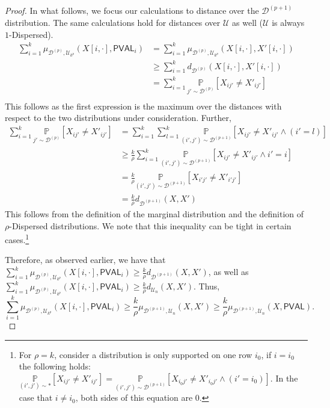 \documentclass[11pt]{article}
\newcommand{\PVAL}{\mathsf{PVAL}}
\newcommand{\sU}{\mathcal{U}}
\newcommand{\sD}{\mathcal{D}}
\begin{document}
\begin{proof}
In what follows, we focus our calculations to distance over the $\sD^{(p+1)}$ distribution. The same calculations hold for distances over $\sU$ as well ($\sU$ is always $1$-Dispersed).
\begin{equation*}
    \begin{split}
        \sum_{i=1}^{k}\mu_{\mathcal{D}^{(p)},\mathcal{U}_{k^{p}}}(X[i,\cdot], \PVAL_{i})&=\sum_{i=1}^{k}\mu_{\mathcal{D}^{(p)}, \mathcal{U}_{k^{p}}}(X[i,\cdot], X'[i,\cdot]) \\
        &\geq \sum_{i=1}^{k}d_{\sD^{(p)}}(X[i,\cdot], X'[i,\cdot])\\
        &= \sum_{i=1}^{k} \underset{j'\sim \sD^{(p)}}{\mathbb{P}}\left[X_{ij'}\neq X'_{ij'}\right]\\
    \end{split}    
\end{equation*}
This follows as the first expression is the maximum over the distances with respect to the two distributions under consideration. Further,
\begin{equation*}
    \begin{split}
        \sum_{i=1}^{k} \underset{j'\sim \sD^{(p)}}{\mathbb{P}}\left[X_{ij'}\neq X'_{ij'}\right]&= \sum_{i=1}^{k}\sum_{l=1}^{k}\underset{(i',j')\sim \mathcal{D}^{(p+1)}}{\mathbb{P}}\left [X_{ij'}\neq X'_{ij'}\wedge (i'=l)\right]\\
        &\geq \frac{k}{\rho}\sum_{i=1}^{k} \underset{(i',j')\sim \sD^{(p+1)}}{\mathbb{P}}\left[X_{ij'}\neq X'_{ij'}\wedge i'=i\right]\\
        &=\frac{k}{\rho}\underset{(i',j')\sim \sD^{(p+1)}}{\mathbb{P}}\left[X_{i'j'}\neq X'_{i'j'}\right]\\
        &=\frac{k}{\rho}d_{\sD^{(p+1)}}(X,X')
    \end{split}
\end{equation*}
This follows from the definition of the marginal distribution and the definition of $\rho$-Dispersed distributions. We note that this inequality can be tight in certain cases.\footnote{For $\rho=k$, consider a distribution is only supported on one row $i_{0}$, if $i=i_{0}$ the following holds: $\underset{(i',j')\sim \ast}{\mathbb{P}}\left[X_{ij'}\neq X'_{ij'}\right]=\underset{(i',j')\sim \mathcal{D}^{(p+1)}}{\mathbb{P}}\left[X_{i_{0}j'}\neq X'_{i_{0}j'}\wedge (i'=i_{0})\right]$. In the case that $i\neq i_{0}$, both sides of this equation are $0$.} 

Therefore, as observed earlier, we have that $\sum_{i=1}^{k}\mu_{\mathcal{D}^{(p)},\mathcal{U}_{k^{p}}}(X[i,\cdot], \PVAL_{i})\geq \frac{k}{\rho}d_{\sD^{(p+1)}}(X,X')$, as well as $\sum_{i=1}^{k}\mu_{\mathcal{D}^{(p)},\mathcal{U}_{k^{p}}}(X[i,\cdot], \PVAL_{i})\geq \frac{k}{\rho}d_{\mathcal{U}_{n}}(X,X')$. Thus, 
\begin{equation*}
    \sum_{i=1}^{k}\mu_{\mathcal{D}^{(p)},\mathcal{U}_{k^{p}}}(X[i,\cdot], \PVAL_{i})\geq \frac{k}{\rho}\mu_{\mathcal{D}^{(p+1)},\mathcal{U}_{n}}(X,X')\geq \frac{k}{\rho}\mu_{\mathcal{D}^{(p+1)},\mathcal{U}_{n}}(X, \PVAL).
\end{equation*}
\end{proof}
\end{document}

